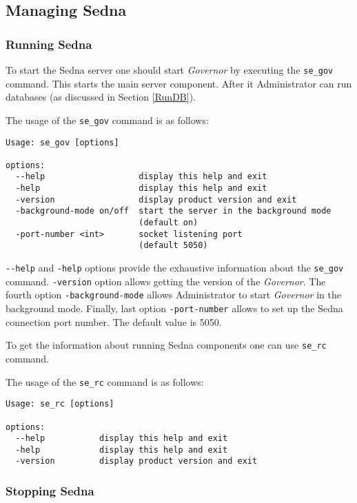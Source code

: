 \documentclass[a4paper,12pt]{article}
\begin{document}
\subsection{Managing Sedna}
\subsubsection{Running Sedna}
\label{StartSedna}

To start the Sedna server one should start \emph{Governor} by executing the \verb!se_gov! command. This starts the main server component. After it Administrator can run databases (as discussed in Section \ref{RunDB}).


The usage of the \verb!se_gov! command is as follows:

\begin{verbatim}
Usage: se_gov [options]

options:
  --help                   display this help and exit
  -help                    display this help and exit
  -version                 display product version and exit
  -background-mode on/off  start the server in the background mode 
                           (default on)
  -port-number <int>       socket listening port
                           (default 5050)
\end{verbatim}

\verb!--help! and \verb!-help! options provide the exhaustive information about the \verb!se_gov! command.
\verb!-version! option allows getting the version of the \emph{Governor}.
The fourth option \verb!-background-mode! allows Administrator to start \emph{Governor} in the background mode. Finally, last option \verb!-port-number! allows to set up the Sedna connection port number. The default value is 5050.

To get the information about running Sedna components one can use \verb!se_rc! command.

The usage of the \verb!se_rc! command is as follows:

\begin{verbatim}
Usage: se_rc [options]

options:
  --help		   display this help and exit
  -help			   display this help and exit
  -version		   display product version and exit
\end{verbatim}


\subsubsection{Stopping Sedna}
\end{document}
